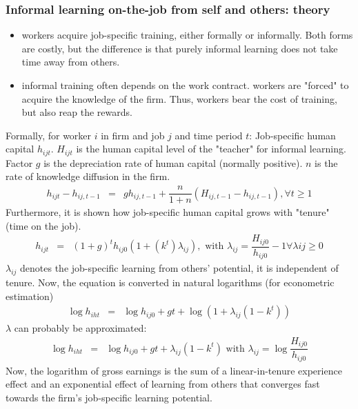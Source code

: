 \documentclass[12pt,a4paper]{article}
\begin{document}
  \subsubsection{Informal learning on-the-job from self and others: theory} %
  \label{ssub:Informal learning on-the-job from self and others: theory}
  \begin{itemize}
    \item workers acquire job-specific training, either formally or informally. Both forms are
      costly, but the difference is that purely informal learning does not take time away from
      others.
    \item informal training often depends on the work contract. workers are "forced" to acquire the
      knowledge of the firm. Thus, workers bear the cost of training, but also reap the rewards.
  \end{itemize}
  Formally, for worker $i$ in firm and job $j$ and time period $t$: Job-specific human capital
  $h_{ijt}$. $H_{ijt}$ is the human capital level of the "teacher" for informal learning. Factor
  $g$ is the depreciation rate of human capital (normally positive). $n$ is the rate of knowledge
  diffusion in the firm.
  \begin{eqnarray}
    h_{ijt}- h_{ij,t-1} &=& gh_{ij,t-1}+ \dfrac{n}{1+n}(H_{ij,t-1} - h_{ij,t-1} ), \forall t \geq
    1
  \end{eqnarray}
  Furthermore, it is shown how job-specific human capital grows with "tenure" (time on the job).
  \setcounter{equation}{2}
  \begin{eqnarray}
    h_{ijt} &=& (1+g)^t h_{ij0} (1+(k^t)\lambda_{ij}) , \mbox{  with  } \lambda_{ij} =
    \dfrac{H_{ij0}}{h_{ij0}} -1 \forall \lambda{ij} \geq 0
  \end{eqnarray}
  $\lambda_{ij}$ denotes the job-specific learning from others' potential, it is independent of
  tenure. Now, the equation is converted in natural logarithms (for econometric estimation)
  \begin{eqnarray}
    \log h_{iht} &=& \log h_{ij0} + gt + \log (1+ \lambda_{ij}(1-k^t))
  \end{eqnarray}
  $\lambda$ can probably be approximated:
  \begin{eqnarray}
    \log h_{iht} &=& \log h_{ij0} + gt + \lambda_{ij}(1-k^t) \mbox{  with  } \lambda_{ij} = \log
    \dfrac{H_{ij0}}{h_{ij0}}
  \end{eqnarray}
  Now, the logarithm of gross earnings is the sum of a linear-in-tenure experience effect and an
  exponential effect of learning from others that converges fast towards the firm's job-specific
  learning potential.
\end{document}
